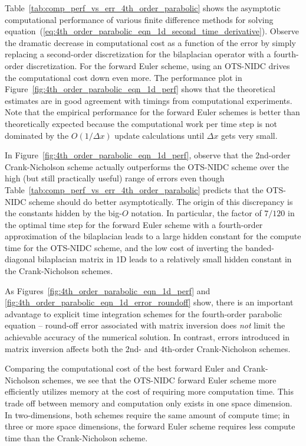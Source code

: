 \documentclass[fleqn,12pt,twoside]{article}
\def\dx{\Delta x}
\begin{document}
Table~\ref{tab:comp_perf_vs_err_4th_order_parabolic} shows the asymptotic
computational performance of various finite difference methods for solving 
equation~(\ref{eq:4th_order_parabolic_eqn_1d_second_time_derivative}).
Observe the dramatic decrease in computational cost as a function of the
error by simply replacing a second-order discretization for the bilaplacian 
operator with a fourth-order discretization.  For the forward Euler scheme,
using an OTS-NIDC drives the computational cost down even more.
The performance plot in Figure~\ref{fig:4th_order_parabolic_eqn_1d_perf} 
shows that the theoretical estimates are in good agreement with timings 
from computational experiments.  Note that the empirical performance for the 
forward Euler schemes is better than theoretically expected because the 
computational work per time step is not dominated by the 
$O(1/\dx)$ update calculations until $\dx$ gets very small.

In Figure~\ref{fig:4th_order_parabolic_eqn_1d_perf}, observe that the 
2nd-order Crank-Nicholson scheme actually outperforms the OTS-NIDC scheme over 
the high (but still practically useful) range of errors even though 
Table~\ref{tab:comp_perf_vs_err_4th_order_parabolic} predicts that the OTS-NIDC
scheme should do better asymptotically.  The origin of this discrepancy is the
constants hidden by the big-$O$ notation.  In particular, the factor of $7/120$
in the optimal time step for the forward Euler scheme with a fourth-order 
approximation of the bilaplacian leads to a large hidden constant 
for the compute time for the OTS-NIDC scheme, and the low cost of inverting
the banded-diagonal bilaplacian matrix in 1D leads to a relatively small hidden
constant in the Crank-Nicholson schemes.

As Figures~\ref{fig:4th_order_parabolic_eqn_1d_perf} and
\ref{fig:4th_order_parabolic_eqn_1d_error_roundoff} show, there is an
important advantage to explicit time integration schemes for the fourth-order
parabolic equation -- round-off error associated with matrix inversion does 
\emph{not} limit the achievable accuracy of the numerical solution.  In 
contrast, errors introduced in matrix inversion affects both the 2nd- and
4th-order Crank-Nicholson schemes. 

Comparing the computational cost of the best forward Euler and Crank-Nicholson 
schemes, we see that the OTS-NIDC forward Euler scheme more efficiently 
utilizes memory at the cost of requiring more computation time.  This trade off 
between memory and computation only exists in one space dimension.  In 
two-dimensions, both schemes require the same amount of compute time; in three 
or more space dimensions, the forward Euler scheme requires less compute time 
than the Crank-Nicholson scheme.  
\end{document}
